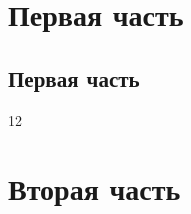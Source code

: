 \documentclass[a4paper,12pt]{extarticle}
\begin{document}


 

\section{Первая часть}\label{sec:s1}
\subsection{Первая часть}\label{sec:s2}
12
\section{Вторая часть}
\end{document}
